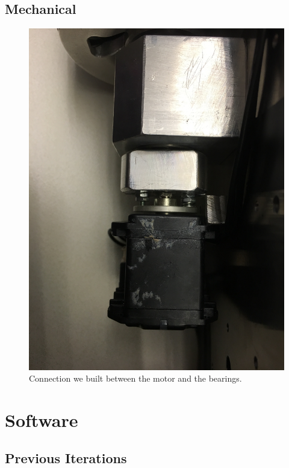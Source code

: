 \documentclass[12pt,conference,onecolumn,titlepage]{IEEEtran} %
\begin{document}
\subsection{Mechanical} %
\label{sec:mechanical}
\begin{figure}[h!]
  \centering
  \includegraphics[width=\textwidth]{motor2bearing.jpg}
  \caption{Connection we built between the motor and the bearings.}
  \label{fig:motor2bearing}
\end{figure}

\section{Software}
\label{sec:software}
% 

\subsection{Previous Iterations}
\label{sec:previous-iterations}
\end{document}
